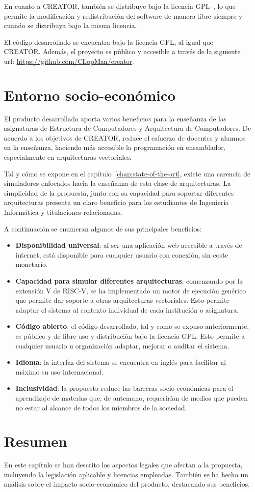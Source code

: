 En cuanto a CREATOR, también se distribuye bajo la licencia GPL~\cite{gnu-license}, lo que permite la modificación y redistribución del software de manera libre siempre y cuando se distribuya bajo la misma licencia.

El código desarrollado se encuentra bajo la licencia GPL, al igual que CREATOR. Además, el proyecto es público y accesible a través de la siguiente url: \url{https://github.com/CLopMan/creator}.

\section{Entorno socio-económico}\label{sec:socio-economico}

El producto desarrollado aporta varios beneficios para la enseñanza de las asignaturas de Estructura de Computadores y Arquitectura de Computadores. De acuerdo a los objetivos de CREATOR, reduce el esfuerzo de docentes y alumnos en la enseñanza, haciendo más accesible la programación en ensamblador, especialmente en arquitecturas vectoriales.

Tal y cómo se expone en el capítulo~\ref{chap:state-of-the-art}, existe una carencia de simuladores enfocados hacia la enseñanza de esta clase de arquitecturas. La simplicidad de la propuesta, junto con su capacidad para soportar diferentes arquitecturas presenta un claro beneficio para los estudiantes de Ingeniería Informática y titulaciones relacionadas.

A continuación se enumeran algunos de sus principales beneficios:
\begin{itemize}
    \item \textbf{Disponibilidad universal}: al ser una aplicación web accesible a través de internet, está disponible para cualquier usuario con conexión, sin coste monetario.
    \item \textbf{Capacidad para simular diferentes arquitecturas}: comenzando por la extensión V de RISC-V, se ha implementado un motor de ejecución genérico que permite dar soporte a otras arquitecturas vectoriales. Esto permite adaptar el sistema al contexto individual de cada institución o asignatura.
    \item\textbf{Código abierto}: el código desarrollado, tal y como se expuso anteriormente, es público y de libre uso y distribución bajo la licencia GPL. Esto permite a cualquier usuario u organización adaptar, mejorar o auditar el sistema.
    \item\textbf{Idioma}: la interfaz del sistema se encuentra en inglés para facilitar al máximo su uso internacional.
    \item\textbf{Inclusividad}: la propuesta reduce las barreras socio-económicas para el aprendizaje de materias que, de antemano, requerirían de medios que pueden no estar al alcance de todos los miembros de la sociedad.
\end{itemize}

\section{Resumen}
En este capítulo se han descrito los aspectos legales que afectan a la propuesta, incluyendo la legislación aplicable y licencias empleadas. También se ha hecho un análisis sobre el impacto socio-económico del producto, destacando sus beneficios.
